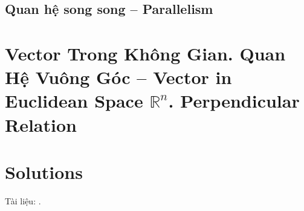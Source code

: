 \documentclass{article}
\numberwithin{equation}{section}
\begin{document}

\subsection{Quan hệ song song -- Parallelism}


\section{Vector Trong Không Gian. Quan Hệ Vuông Góc -- Vector in Euclidean Space $\mathbb{R}^n$. Perpendicular Relation}


\section{Solutions}


Tài liệu: \cite{SGK_Toan_11_dai_so_giai_tich_co_ban, SGK_Toan_11_dai_so_giai_tich_nang_cao, SGK_Toan_11_hinh_hoc_co_ban, SGK_Toan_11_hinh_hoc_nang_cao, TL_chuyen_Toan_Dai_So_Giai_Tich_11, TL_chuyen_Toan_Hinh_Hoc_11}.

\printbibliography[heading=bibintoc]
	
\end{document}
